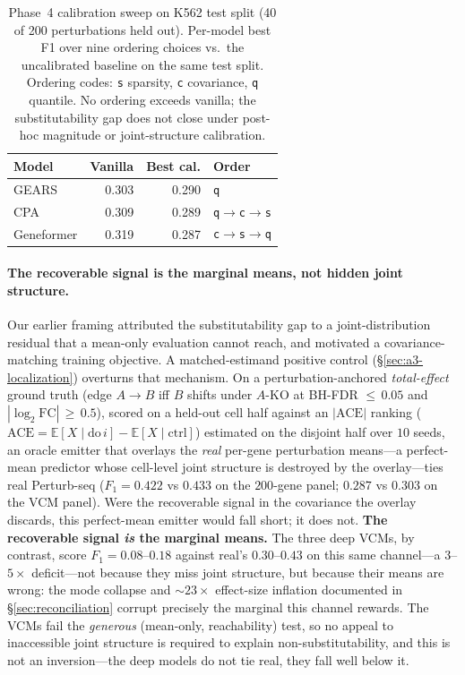 \documentclass{article}
\theoremstyle{plain}
\theoremstyle{definition}
\theoremstyle{remark}
\begin{document}
\begin{table}[h]
\centering
\small
\begin{tabular}{lrrl}
\toprule
\textbf{Model} & \textbf{Vanilla} & \textbf{Best cal.} & \textbf{Order} \\
\midrule
GEARS       & 0.303 & 0.290 & \texttt{q} \\
CPA         & 0.309 & 0.289 & \texttt{q$\to$c$\to$s} \\
Geneformer  & 0.319 & 0.287 & \texttt{c$\to$s$\to$q} \\
\bottomrule
\end{tabular}
\caption{Phase~4 calibration sweep on K562 test split (40 of 200 perturbations held out). Per-model best F1 over nine ordering choices vs.\ the uncalibrated baseline on the same test split. Ordering codes: \texttt{s} sparsity, \texttt{c} covariance, \texttt{q} quantile. No ordering exceeds vanilla; the substitutability gap does not close under post-hoc magnitude or joint-structure calibration.}
\label{tab:calib_sweep}
\end{table}

\paragraph{The recoverable signal is the marginal means, not hidden joint structure.}
Our earlier framing attributed the substitutability gap to a joint-distribution residual that a mean-only evaluation cannot reach, and motivated a covariance-matching training objective. A matched-estimand positive control (\S\ref{sec:a3-localization}) overturns that mechanism. On a perturbation-anchored \emph{total-effect} ground truth (edge $A\!\to\!B$ iff $B$ shifts under $A$-KO at BH-FDR ${\le}\,0.05$ and $|\log_2\mathrm{FC}|\,{\ge}\,0.5$), scored on a held-out cell half against an $|\mathrm{ACE}|$ ranking ($\mathrm{ACE}=\mathbb{E}[X\mid \mathrm{do}\,i]-\mathbb{E}[X\mid\mathrm{ctrl}]$) estimated on the disjoint half over $10$ seeds, an oracle emitter that overlays the \emph{real} per-gene perturbation means---a perfect-mean predictor whose cell-level joint structure is destroyed by the overlay---ties real Perturb-seq ($F_1 = 0.422$ vs $0.433$ on the $200$-gene panel; $0.287$ vs $0.303$ on the VCM panel). Were the recoverable signal in the covariance the overlay discards, this perfect-mean emitter would fall short; it does not. \textbf{The recoverable signal \emph{is} the marginal means.} The three deep VCMs, by contrast, score $F_1 = 0.08$--$0.18$ against real's $0.30$--$0.43$ on this same channel---a $3$--$5\times$ deficit---not because they miss joint structure, but because their means are wrong: the mode collapse and ${\sim}23\times$ effect-size inflation documented in \S\ref{sec:reconciliation} corrupt precisely the marginal this channel rewards. The VCMs fail the \emph{generous} (mean-only, reachability) test, so no appeal to inaccessible joint structure is required to explain non-substitutability, and this is not an inversion---the deep models do not tie real, they fall well below it.
\end{document}
